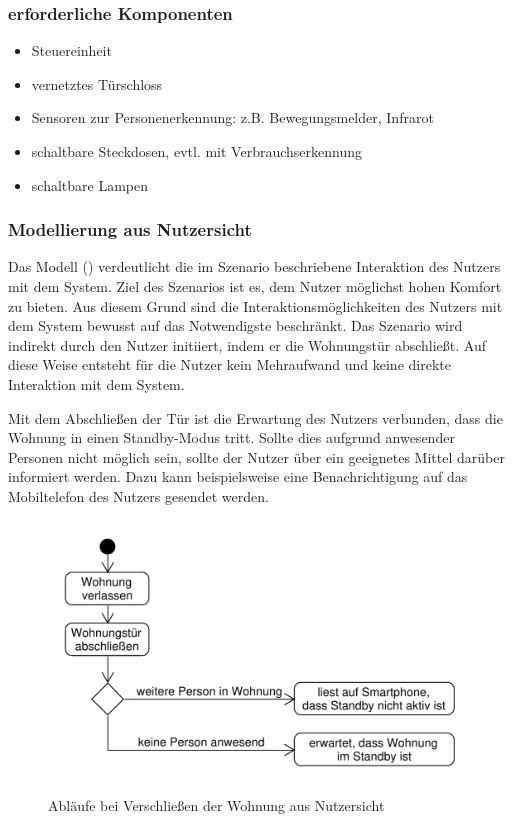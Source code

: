 \subsubsection{erforderliche Komponenten}
\begin{itemize}
	\item Steuereinheit
	\item vernetztes Türschloss
	\item Sensoren zur Personenerkennung: z.B. Bewegungsmelder, Infrarot
	\item schaltbare Steckdosen, evtl. mit Verbrauchserkennung
	\item schaltbare Lampen
\end{itemize}


\subsubsection{Modellierung aus Nutzersicht}
Das Modell () verdeutlicht die im Szenario beschriebene Interaktion des Nutzers mit dem System. Ziel des Szenarios ist es, dem Nutzer möglichst hohen Komfort zu bieten. Aus diesem Grund sind die Interaktionsmöglichkeiten des Nutzers mit dem System bewusst auf das Notwendigste beschränkt. Das Szenario wird indirekt durch den Nutzer initiiert, indem er die Wohnungstür abschließt. Auf diese Weise entsteht für die Nutzer kein Mehraufwand und keine direkte Interaktion mit dem System.

Mit dem Abschließen der Tür ist die Erwartung des Nutzers verbunden, dass die Wohnung in einen Standby-Modus tritt. Sollte dies aufgrund anwesender Personen nicht möglich sein, sollte der Nutzer über ein geeignetes Mittel darüber informiert werden. Dazu kann beispielsweise eine Benachrichtigung auf das Mobiltelefon des Nutzers gesendet werden.

\begin{figure}[h!]
	\centering
	\includegraphics[scale=0.7]{img/Szenarien/WohnungSchliessenNutzersicht.pdf}
	\caption{Abläufe bei Verschließen der Wohnung aus Nutzersicht}
	\label{fig:szenarienStandbyNutzersicht}
\end{figure}

